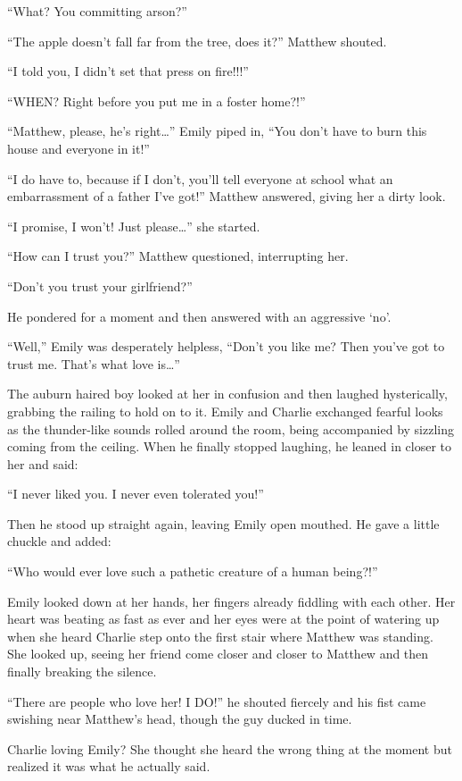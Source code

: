 “What? You committing arson?”

“The apple doesn’t fall far from the tree, does it?” Matthew shouted.

“I told you, I didn’t set that press on fire!!!”

“WHEN? Right before you put me in a foster home?!”

“Matthew, please, he’s right…” Emily piped in, “You don’t have to burn this house and everyone in it!”

“I do have to, because if I don’t, you’ll tell everyone at school what an embarrassment of a father I’ve got!” Matthew answered, giving her a dirty look.

“I promise, I won’t! Just please…” she started.

“How can I trust you?” Matthew questioned, interrupting her.

“Don’t you trust your girlfriend?”

He pondered for a moment and then answered with an aggressive ‘no’.

“Well,” Emily was desperately helpless, “Don’t you like me? Then you’ve got to trust me. That’s what love is…”

The auburn haired boy looked at her in confusion and then laughed hysterically, grabbing the railing to hold on to it. Emily and Charlie exchanged fearful looks as the thunder-like sounds rolled around the room, being accompanied by sizzling coming from the ceiling. When he finally stopped laughing, he leaned in closer to her and said:

“I never liked you. I never even tolerated you!”

Then he stood up straight again, leaving Emily open mouthed. He gave a little chuckle and added:

“Who would ever love such a pathetic creature of a human being?!”

Emily looked down at her hands, her fingers already fiddling with each other. Her heart was beating as fast as ever and her eyes were at the point of watering up when she heard Charlie step onto the first stair where Matthew was standing. She looked up, seeing her friend come closer and closer to Matthew and then finally breaking the silence.

“There are people who love her! I DO!” he shouted fiercely and his fist came swishing near Matthew’s head, though the guy ducked in time.

Charlie loving Emily? She thought she heard the wrong thing at the moment but realized it was what he actually said.

